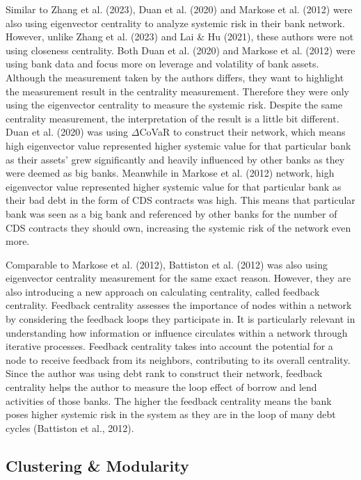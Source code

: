 \documentclass[a4paper,11pt]{article}
\begin{document}
Similar to Zhang et al. (2023), Duan et al. (2020) and Markose et al. (2012) were also using eigenvector centrality to analyze systemic risk in their bank network. However, unlike Zhang et al. (2023) and Lai \& Hu (2021), these authors were not using closeness centrality. Both Duan et al. (2020) and Markose et al. (2012) were using bank data and focus more on leverage and volatility of bank assets. Although the measurement taken by the authors differs, they want to highlight the measurement result in the centrality measurement. Therefore they were only using the eigenvector centrality to measure the systemic risk. Despite the same centrality measurement, the interpretation of the result is a little bit different. Duan et al. (2020) was using $\Delta$CoVaR to construct their network, which means high eigenvector value represented higher systemic value for that particular bank as their assets’ grew significantly and heavily influenced by other banks as they were deemed as big banks. Meanwhile in Markose et al. (2012) network, high eigenvector value represented higher systemic value for that particular bank as their bad debt in the form of CDS contracts was high. This means that particular bank was seen as a big bank and referenced by other banks for the number of CDS contracts they should own, increasing the systemic risk of the network even more.

Comparable to Markose et al. (2012), Battiston et al. (2012) was also using eigenvector centrality measurement for the same exact reason. However, they are also introducing a new approach on calculating centrality, called feedback centrality. Feedback centrality assesses the importance of nodes within a network by considering the feedback loops they participate in. It is particularly relevant in understanding how information or influence circulates within a network through iterative processes. Feedback centrality takes into account the potential for a node to receive feedback from its neighbors, contributing to its overall centrality. Since the author was using debt rank to construct their network, feedback centrality helps the author to measure the loop effect of borrow and lend activities of those banks. The higher the feedback centrality means the bank poses higher systemic risk in the system as they are in the loop of many debt cycles (Battiston et al., 2012).

\subsection{Clustering \& Modularity}
\end{document}
